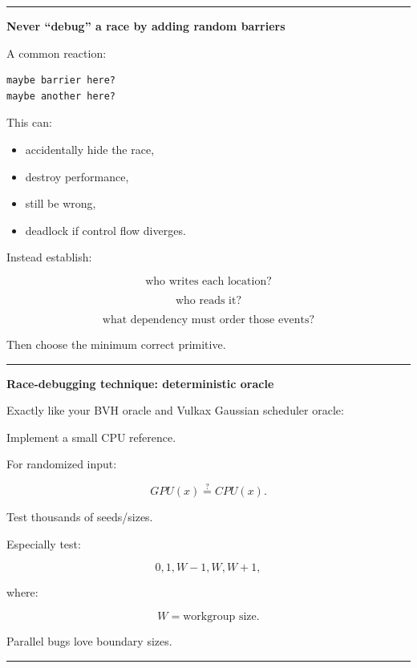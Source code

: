 \begin{center}\rule{0.5\linewidth}{0.5pt}\end{center}

\textbf{Never ``debug'' a race by adding random barriers}

A common reaction:

\protect{}\label{p10-barrier-everywhere}%
\begin{verbatim}
maybe barrier here?
maybe another here?
\end{verbatim}

This can:

\begin{itemize}
\tightlist
\item
  accidentally hide the race,
\item
  destroy performance,
\item
  still be wrong,
\item
  deadlock if control flow diverges.
\end{itemize}

Instead establish:

\[
\boxed{
\text{who writes each location?}
}
\]

\[
\boxed{
\text{who reads it?}
}
\]

\[
\boxed{
\text{what dependency must order those events?}
}
\]

Then choose the minimum correct primitive.

\begin{center}\rule{0.5\linewidth}{0.5pt}\end{center}

\textbf{Race-debugging technique: deterministic oracle}

Exactly like your BVH oracle and Vulkax Gaussian scheduler oracle:

Implement a small CPU reference.

For randomized input:

\[
GPU(x)
\stackrel{?}{=}
CPU(x).
\]

Test thousands of seeds/sizes.

Especially test:

\[
0,
1,
W-1,
W,
W+1,
\]

where:

\[
W=\text{workgroup size}.
\]

Parallel bugs love boundary sizes.

\begin{center}\rule{0.5\linewidth}{0.5pt}\end{center}

